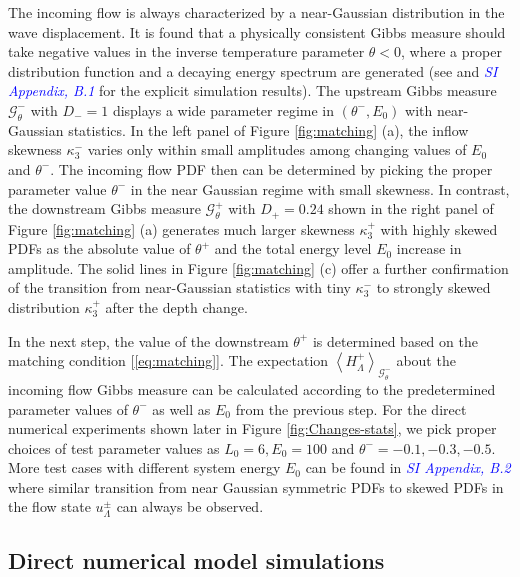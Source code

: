 \documentclass[9pt,twocolumn,twoside,lineno]{pnas-new}
\begin{document}
The incoming flow is always characterized by a near-Gaussian distribution
in the wave displacement. It is found that a physically consistent
Gibbs measure should take negative values in the inverse temperature
parameter $\theta<0$, where a proper distribution function and a
decaying energy spectrum are generated (see \cite{bajars2013weakly}
and \textcolor{blue}{\emph{SI Appendix, B.1}} for the explicit simulation results).
The upstream Gibbs measure $\mathcal{G}_{\theta}^{-}$ with $D_{-}=1$
displays a wide parameter regime in $\left(\theta^{-},E_{0}\right)$
with near-Gaussian statistics. In the left panel of Figure \ref{fig:matching}
(a), the inflow skewness $\kappa_3^{-}$ varies only within small amplitudes
among changing values of $E_{0}$ and $\theta^{-}$. The incoming
flow PDF then can be determined by picking the proper parameter value
$\theta^{-}$ in the near Gaussian regime with small skewness. In
contrast, the downstream Gibbs measure $\mathcal{G}_{\theta}^{+}$
with $D_{+}=0.24$ shown in the right panel of Figure \ref{fig:matching}
(a) generates much larger skewness $\kappa_3^{+}$ with highly skewed
PDFs as the absolute value of $\theta^{+}$ and the total energy level
$E_{0}$ increase in amplitude. The solid lines in Figure \ref{fig:matching}
(c) offer a further confirmation of the transition from near-Gaussian
statistics with tiny $\kappa_3^{-}$ to strongly skewed distribution
$\kappa_3^{+}$ after the depth change.

In the next step, the value of the downstream $\theta^{+}$ is determined
based on the matching condition [\ref{eq:matching}]. The expectation
$\left\langle H_{\Lambda}^{+}\right\rangle _{\mathcal{G}_{\theta}^{-}}$
about the incoming flow Gibbs measure can be calculated according
to the predetermined parameter values of $\theta^{-}$ as well as
$E_{0}$ from the previous step. For the direct numerical experiments
shown later in Figure \ref{fig:Changes-stats}, we pick proper choices
of test parameter values as $L_{0}=6, E_{0}=100$ and $\theta^{-}=-0.1,-0.3,-0.5$.
More test cases with different system energy $E_{0}$ can be found
in \textcolor{blue}{\emph{SI Appendix, B.2}} where similar transition from near
Gaussian symmetric PDFs to skewed PDFs in the flow state $u_{\Lambda}^{\pm}$
can always be observed.

\subsection{Direct numerical model simulations}
\end{document}
